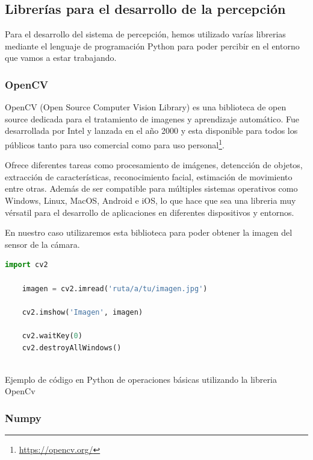 \subsection{Librerías para el desarrollo de la percepción}
\label{sec:librerias}
Para el desarrollo del sistema de percepción, hemos utilizado varías librerias mediante el lenguaje de programación Python para poder
percibir en el entorno que vamos a estar trabajando. 
\subsubsection{OpenCV}
\label{sec:OpenCV}
OpenCV (Open Source Computer Vision Library) es una biblioteca de open source dedicada para el tratamiento de imagenes y aprendizaje automático. Fue desarrollada por Intel y lanzada en 
el año 2000 y esta disponible para todos los públicos tanto para uso comercial como para uso personal\footnote{\url{https://opencv.org/}}.  \newline

Ofrece diferentes tareas como procesamiento de imágenes, detencción de objetos, extracción de características, reconocimiento facial, estimación de movimiento entre otras. Además de ser
compatible para múltiples sistemas operativos como Windows, Linux, MacOS, Android e iOS, lo que hace que sea una libreria muy vérsatil para el desarrollo de aplicaciones en diferentes
dispositivos y entornos. \newline

En nuestro caso utilizaremos esta biblioteca para poder obtener la imagen del sensor de la cámara.

\begin{code}[h]
  \begin{lstlisting}[language=Python]
    import cv2

    imagen = cv2.imread('ruta/a/tu/imagen.jpg')
    
    cv2.imshow('Imagen', imagen)
    
    cv2.waitKey(0)
    cv2.destroyAllWindows()
    
  \end{lstlisting}
  \caption[Ejemplo de código en Python de operaciones básicas utilizando la libreria OpenCv]{Ejemplo de código en Python de operaciones básicas utilizando la libreria OpenCv}
  \label{cod:Numpy}
  \end{code}  

\subsubsection{Numpy}
\label{sec:Numpy}

